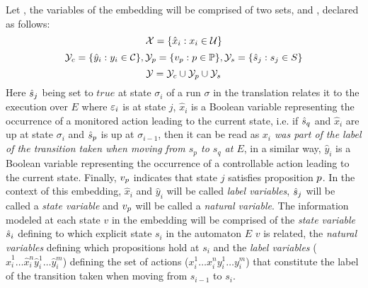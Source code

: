 %
Let \cltsDef, the variables of the embedding will be comprised of two sets, \gsX and \gsY, declared as follows:
\[{\mathcal{X}} = \{\hat{x}_i : x_i \in \mathcal{U} \}\]
\[{\mathcal{Y}}_c = \{\hat{y}_i : y_i \in \mathcal{C} \}, {\mathcal{Y}}_p = \{v_{p} : p \in \mathbb{P}\}, {\mathcal{Y}}_s = \{\hat{s}_{j} : s_j \in S \}\]
\[{\mathcal{Y}} = {\mathcal{Y}}_c \cup {\ensuremath{\mathcal{Y}}}_p \cup {\ensuremath{\mathcal{Y}}}_s \]
Here $\hat{s}_{j}$ being set to $true$ at state $\sigma_i$ of a run $\sigma$ in the translation relates it to the execution \execution over $E$ where $\varepsilon_i$ is at state $j$, $\hat{x}_i$ is a Boolean variable representing the occurrence of a monitored action leading to the current state, i.e. if $\hat{s}_{q}$ and $\hat{x}_i$ are up at state $\sigma_i$ and $\hat{s}_{p}$ is up at $\sigma_{i-1}$, then it can be read as \emph{$x_i$ was part of the label of the transition taken when moving from $s_p$ to $s_q$ at $E$}, in a similar way, $\hat{y}_i$ is a Boolean variable representing the occurrence of a controllable action leading to the current state. Finally, $v_{p}$ indicates that state $j$ satisfies proposition $p$. In the context of this embedding, $\hat{x}_i$ and $\hat{y}_i$ will be called \emph{label variables}, $\hat{s}_{j}$ will be called a \emph{state variable} and $v_{p}$ will be called a \emph{natural variable}. The information modeled at each state $v$ in the embedding \fdsEmbedding will be comprised of the \emph{state variable} $\hat{s}_{i}$ defining to which explicit state $s_i$ in the automaton $E$ $v$ is related, the \emph{natural variables} defining which propositions hold at $s_i$ and the \emph{label variables} ($\hat{x}_i^1\ldots \hat{x}_i^n \hat{y}_i^1\ldots \hat{y}_i^m$) defining the set of actions ($x_i^1\ldots x_i^n y_i^1\ldots y_i^m$) that constitute the label of the transition taken when moving from $s_{i-1}$ to $s_i$.

